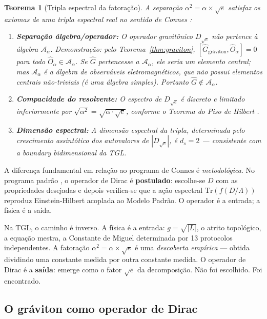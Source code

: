 \documentclass[12pt,a4paper,twoside]{article}
\newtheorem{theorem}{Teorema}[section]
\newcommand{\alphaii}{\alpha^{2}}
\newcommand{\boundary}{\textit{boundary}}
\begin{document}
\begin{theorem}[Tripla espectral da fatoração]
\label{thm:tripla}
A separação $\alphaii = \alpha \times \sqrt{e}$ satisfaz os axiomas de uma tripla espectral real no sentido de Connes \cite{Connes1996}:
\begin{enumerate}[nosep]
\item \textbf{Separação álgebra/operador:} O operador gravitônico $D_{\sqrt{e}}$ não pertence à álgebra $\mathcal{A}_\alpha$. Demonstração: pelo Teorema~\ref{thm:graviton}, $[\hat{G}_{\text{gráviton}}, \hat{O}_\alpha] = 0$ para todo $\hat{O}_\alpha \in \mathcal{A}_\alpha$. Se $\hat{G}$ pertencesse a $\mathcal{A}_\alpha$, ele seria um elemento central; mas $\mathcal{A}_\alpha$ é a álgebra de observáveis eletromagnéticos, que não possui elementos centrais não-triviais (é uma álgebra simples). Portanto $\hat{G} \notin \mathcal{A}_\alpha$.
\item \textbf{Compacidade do resolvente:} O espectro de $D_{\sqrt{e}}$ é discreto e limitado inferiormente por $\sqrt{\alphaii} = \sqrt{\alpha \cdot \sqrt{e}}$, conforme o Teorema do Piso de Hilbert \cite{Miguel2026Graviton}.
\item \textbf{Dimensão espectral:} A dimensão espectral da tripla, determinada pelo crescimento assintótico dos autovalores de $|D_{\sqrt{e}}|$, é $d_s = 2$ --- consistente com a \boundary{} bidimensional da TGL.
\end{enumerate}
\end{theorem}

A diferença fundamental em relação ao programa de Connes é \textit{metodológica}. No programa padrão \cite{Connes1996, Chamseddine1997}, o operador de Dirac é \textbf{postulado}: escolhe-se $D$ com as propriedades desejadas e depois verifica-se que a ação espectral $\text{Tr}(f(D/\Lambda))$ reproduz Einstein-Hilbert acoplada ao Modelo Padrão. O operador é a entrada; a física é a saída.

Na TGL, o caminho é inverso. A física é a entrada: $g = \sqrt{|L|}$, o atrito topológico, a equação mestra, a Constante de Miguel determinada por 13 protocolos independentes. A fatoração $\alphaii = \alpha \times \sqrt{e}$ é uma \textit{descoberta empírica} --- obtida dividindo uma constante medida por outra constante medida. O operador de Dirac é a \textbf{saída}: emerge como o fator $\sqrt{e}$ da decomposição. Não foi escolhido. Foi encontrado.


\subsection{O gráviton como operador de Dirac}
\label{subsec:dirac}
\end{document}
